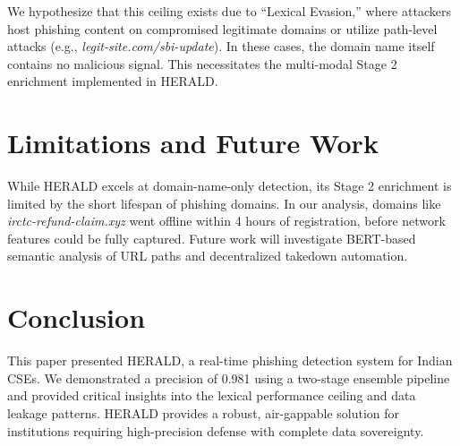 \documentclass[journal]{IEEEtran}
\begin{document}
We hypothesize that this ceiling exists due to ``Lexical Evasion,'' where attackers host phishing content on compromised legitimate domains or utilize path-level attacks (e.g., \textit{legit-site.com/sbi-update}). In these cases, the domain name itself contains no malicious signal. This necessitates the multi-modal Stage 2 enrichment implemented in HERALD.

\section{Limitations and Future Work}
While HERALD excels at domain-name-only detection, its Stage 2 enrichment is limited by the short lifespan of phishing domains. In our analysis, domains like \textit{irctc-refund-claim.xyz} went offline within 4 hours of registration, before network features could be fully captured. Future work will investigate BERT-based semantic analysis of URL paths and decentralized takedown automation.

\section{Conclusion}
This paper presented HERALD, a real-time phishing detection system for Indian CSEs. We demonstrated a precision of 0.981 using a two-stage ensemble pipeline and provided critical insights into the lexical performance ceiling and data leakage patterns. HERALD provides a robust, air-gappable solution for institutions requiring high-precision defense with complete data sovereignty.
\end{document}
